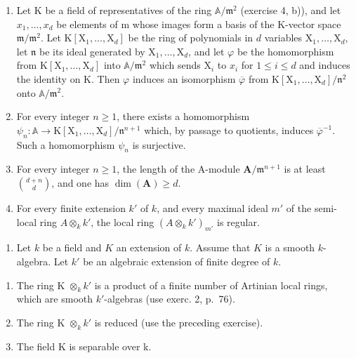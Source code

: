 \begin{enumerate}
\def\labelenumi{\alph{enumi})}
\item
  Let K be a field of representatives of the ring \(\mathbb{A}/\mathfrak{m}^2\) (exercise 4, b)), and let \(x_1, \ldots, x_d\) be elements of m whose images form a basis of the K-vector space \(\mathfrak{m}/\mathfrak{m}^2\). Let \(\mathrm{K}[\mathrm{X}_1, \ldots, \mathrm{X}_d]\) be the ring of polynomials in \(d\) variables \(\mathrm{X}_1, \ldots, \mathrm{X}_d\), let \(\mathfrak{n}\) be its ideal generated by \(\mathrm{X}_1, \ldots, \mathrm{X}_d\), and let \(\varphi\) be the homomorphism from \(\mathrm{K}[\mathrm{X}_1, \ldots, \mathrm{X}_d]\) into \(\mathbb{A}/\mathfrak{m}^2\) which sends \(\mathrm{X}_i\) to \(x_i\) for \(1 \leqslant i \leqslant d\) and induces the identity on K. Then \(\varphi\) induces an isomorphism \(\overline{\varphi}\) from \(\mathrm{K}[\mathrm{X}_1, \ldots, \mathrm{X}_d]/\mathfrak{n}^2\) onto \(\mathbb{A}/\mathfrak{m}^2\).
\item
  For every integer \(n \geqslant 1\), there exists a homomorphism \(\psi_n: \mathbb{A} \to \mathrm{K}[\mathrm{X}_1, \ldots, \mathrm{X}_d]/\mathfrak{n}^{n+1}\) which, by passage to quotients, induces \(\overline{\varphi}^{-1}\). Such a homomorphism \(\psi_n\) is surjective.
\item
  For every integer \(n \geqslant 1\), the length of the A-module \(\mathbf{A} / \mathfrak{m}^{n+1}\) is at least \(\binom{d+n}{d}\), and one has \(\dim(\mathbf{A}) \geqslant d\).
\item
  For every finite extension \(k'\) of \(k\), and every maximal ideal \(m'\) of the semi-local ring \(A \otimes_k k'\), the local ring \((A \otimes_k k')_{m'}\) is regular.
\end{enumerate}

\begin{enumerate}
\def\labelenumi{\arabic{enumi})}
\setcounter{enumi}{5}
\tightlist
\item
  Let \(k\) be a field and \(K\) an extension of \(k\). Assume that \(K\) is a smooth \(k\)-algebra. Let \(k'\) be an algebraic extension of finite degree of \(k\).
\end{enumerate}

\begin{enumerate}
\def\labelenumi{\alph{enumi})}
\item
  The ring K \(\otimes_{k} k'\) is a product of a finite number of Artinian local rings, which are smooth \(k'\)-algebras (use exerc. 2, p.~76).
\item
  The ring K \(\otimes_{k} k'\) is reduced (use the preceding exercise).
\item
  The field K is separable over k.
\end{enumerate}


